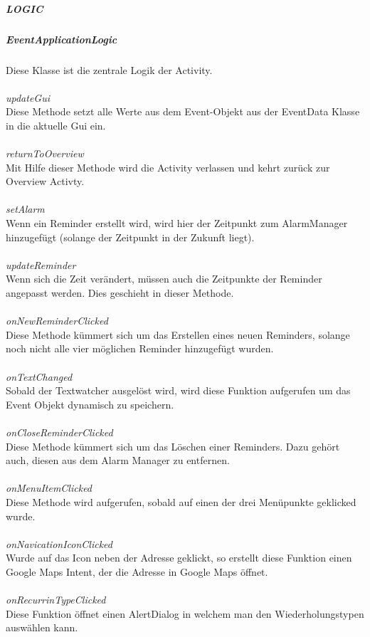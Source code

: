\subparagraph{LOGIC}
\subparagraph*{EventApplicationLogic}
Diese Klasse ist die zentrale Logik der Activity.\\
\\
\textit{updateGui}\\
Diese Methode setzt alle Werte aus dem Event-Objekt aus der EventData Klasse in die aktuelle Gui ein.\\
\\
\textit{returnToOverview}\\
Mit Hilfe dieser Methode wird die Activity verlassen und kehrt zurück zur Overview Activty.\\
\\
\textit{setAlarm}\\
Wenn ein Reminder erstellt wird, wird hier der Zeitpunkt zum AlarmManager hinzugefügt (solange der Zeitpunkt in der Zukunft liegt).\\
\\
\textit{updateReminder}\\
Wenn sich die Zeit verändert, müssen auch die Zeitpunkte der Reminder angepasst werden. Dies geschieht in dieser Methode.\\
\\
\textit{onNewReminderClicked}\\
Diese Methode kümmert sich um das Erstellen eines neuen Reminders, solange noch nicht alle vier möglichen Reminder hinzugefügt wurden.\\
\\
\textit{onTextChanged}\\
Sobald der Textwatcher ausgelöst wird, wird diese Funktion aufgerufen um das Event Objekt dynamisch zu speichern.\\
\\
\textit{onCloseReminderClicked}\\
Diese Methode kümmert sich um das Löschen einer Reminders. Dazu gehört auch, diesen aus dem Alarm Manager zu entfernen.\\
\\
\textit{onMenuItemClicked}\\
Diese Methode wird aufgerufen, sobald auf einen der drei Menüpunkte geklicked wurde.\\
\\
\textit{onNavicationIconClicked}\\
Wurde auf das Icon neben der Adresse geklickt, so erstellt diese Funktion einen Google Maps Intent, der die Adresse in Google Maps öffnet.\\
\\
\textit{onRecurrinTypeClicked}\\
Diese Funktion öffnet einen AlertDialog in welchem man den Wiederholungstypen auswählen kann.

